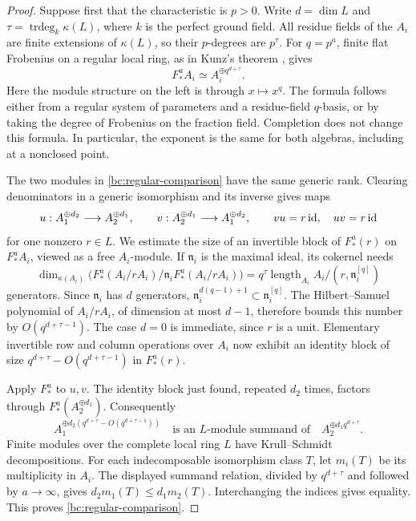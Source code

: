 \begin{proof}
Suppose first that the characteristic is $p>0$.  Write $d=\dim L$ and
$\tau=\operatorname{trdeg}_k\kappa(L)$, where $k$ is the perfect ground
field.  All residue fields of the $A_i$ are finite extensions of
$\kappa(L)$, so their $p$-degrees are $p^\tau$.  For $q=p^a$, finite flat
Frobenius on a regular local ring, as in Kunz's theorem
\cite{Kunz1969}, gives
\begin{equation}\label{bc:frobenius-rank}
       F_*^aA_i\simeq A_i^{\oplus q^{d+\tau}}.
\end{equation}
Here the module structure on the left is through $x\mapsto x^q$.
The formula follows either from a regular system of parameters and a
residue-field $q$-basis, or by taking the degree of Frobenius on the
fraction field.  Completion does not change this formula.  In particular,
the exponent is the same for both algebras, including at a nonclosed
point.

The two modules in \eqref{bc:regular-comparison} have the same generic
rank.  Clearing denominators in a generic isomorphism and its inverse
gives maps
\[
 u:A_1^{\oplus d_2}\longrightarrow A_2^{\oplus d_1},\qquad
 v:A_2^{\oplus d_1}\longrightarrow A_1^{\oplus d_2},
 \qquad vu=r\operatorname{id},\quad uv=r\operatorname{id}
\]
for one nonzero $r\in L$.  We estimate the size of an invertible block of
$F_*^a(r)$ on $F_*^aA_i$, viewed as a free $A_i$-module.  If
$\mathfrak n_i$ is the maximal ideal, its cokernel needs
\[
 \dim_{\kappa(A_i)}
 \bigl(F_*^a(A_i/rA_i)/\mathfrak n_iF_*^a(A_i/rA_i)\bigr)
 =q^\tau\operatorname{length}_{A_i}
       A_i/(r,\mathfrak n_i^{[q]})
\]
generators.  Since $\mathfrak n_i$ has $d$ generators,
$\mathfrak n_i^{d(q-1)+1}\subset\mathfrak n_i^{[q]}$.
The Hilbert--Samuel polynomial of $A_i/rA_i$, of dimension at most $d-1$,
therefore bounds this number by $O(q^{d+\tau-1})$.  The case $d=0$ is
immediate, since $r$ is a unit.  Elementary invertible row and column
operations over $A_i$ now exhibit an identity block of size
$q^{d+\tau}-O(q^{d+\tau-1})$ in $F_*^a(r)$.

Apply $F_*^a$ to $u,v$.  The identity block just found, repeated $d_2$
times, factors through $F_*^a(A_2^{\oplus d_1})$.  Consequently
\[
 A_1^{\oplus d_2(q^{d+\tau}-O(q^{d+\tau-1}))}
 \quad\text{is an $L$-module summand of}\quad
 A_2^{\oplus d_1q^{d+\tau}}.
\]
Finite modules over the complete local ring $L$ have Krull--Schmidt
decompositions.  For each indecomposable isomorphism class $T$, let
$m_i(T)$ be its multiplicity in $A_i$.  The displayed summand relation,
divided by $q^{d+\tau}$ and followed by $a\to\infty$, gives
$d_2m_1(T)\le d_1m_2(T)$.  Interchanging the indices gives equality.
This proves \eqref{bc:regular-comparison}.


\end{proof}
